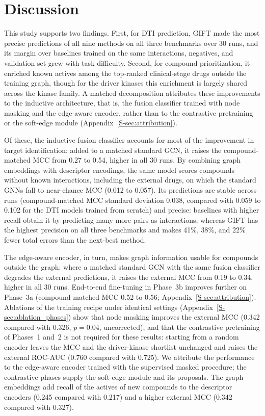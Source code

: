 \documentclass[10pt,letterpaper]{article}
\begin{document}
%
\section{Discussion}
\label{sec:discussion}
This study supports two findings. First, for DTI prediction, GIFT made the most precise predictions of all nine methods on all three benchmarks over 30 runs, and its margin over baselines trained on the same interactions, negatives, and validation set grew with task difficulty. Second, for compound prioritization, it enriched known actives among the top-ranked clinical-stage drugs outside the training graph, though for the driver kinases this enrichment is largely shared across the kinase family. A matched decomposition attributes these improvements to the inductive architecture, that is, the fusion classifier trained with node masking and the edge-aware encoder, rather than to the contrastive pretraining or the soft-edge module (Appendix~\ref{S-sec:attribution}).


Of these, the inductive fusion classifier accounts for most of the improvement in target identification: added to a matched standard GCN, it raises the compound-matched MCC from 0.27 to 0.54, higher in all 30 runs. By combining graph embeddings with descriptor encodings, the same model scores compounds without known interactions, including the external drugs, on which the standard GNNs fall to near-chance MCC (0.012 to 0.057). Its predictions are stable across runs (compound-matched MCC standard deviation 0.038, compared with 0.059 to 0.102 for the DTI models trained from scratch) and precise: baselines with higher recall obtain it by predicting many more pairs as interactions, whereas GIFT has the highest precision on all three benchmarks and makes 41\%, 38\%, and 22\% fewer total errors than the next-best method.


The edge-aware encoder, in turn, makes graph information usable for compounds outside the graph: where a matched standard GCN with the same fusion classifier degrades the external predictions, it raises the external MCC from 0.19 to 0.34, higher in all 30 runs. End-to-end fine-tuning in Phase~3b improves further on Phase~3a (compound-matched MCC 0.52 to 0.56; Appendix~\ref{S-sec:attribution}). Ablations of the training recipe under identical settings (Appendix~\ref{S-sec:ablation_phases}) show that node masking improves the external MCC (0.342 compared with 0.326, $p=0.04$, uncorrected), and that the contrastive pretraining of Phases~1 and~2 is not required for these results: starting from a random encoder leaves the MCC and the driver-kinase shortlist unchanged and raises the external ROC-AUC (0.760 compared with 0.725). We attribute the performance to the edge-aware encoder trained with the supervised masked procedure; the contrastive phases supply the soft-edge module and its proposals. The graph embeddings add recall of the actives of new compounds to the descriptor encoders (0.245 compared with 0.217) and a higher external MCC (0.342 compared with 0.327).
\end{document}
